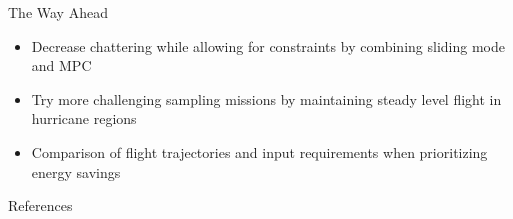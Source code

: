 \documentclass[aspectratio=169]{beamer}
\begin{document}
\begin{frame}{The Way Ahead}
\begin{itemize}
        \item Decrease chattering while allowing for constraints by combining sliding mode and MPC
        \item Try more challenging sampling missions by maintaining steady level flight in hurricane regions
        \item Comparison of flight trajectories and input requirements when prioritizing energy savings
    \end{itemize}
\end{frame}

\begin{frame}{References}
    \nocite{*}
    \footnotesize
    
    
\end{frame}
\end{document}
